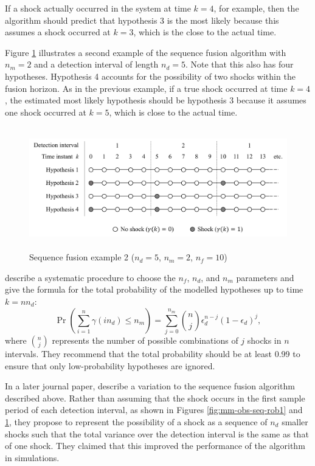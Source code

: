 If a shock actually occurred in the system at time $k=4$, for example, then the algorithm should predict that hypothesis 3 is the most likely because this assumes a shock occurred at $k=3$, which is the close to the actual time.

Figure \ref{fig:mm-obs-seq-rob2} illustrates a second example of the sequence fusion algorithm with $n_m=2$ and a detection interval of length $n_d=5$.  Note that this also has four hypotheses. Hypothesis 4 accounts for the possibility of two shocks within the fusion horizon. As in the previous example, if a true shock occurred at time $k=4$, the estimated most likely hypothesis should be hypothesis 3 because it assumes one shock occurred at $k=5$, which is close to the actual time.

\begin{figure}[htp]
	\centering
	\includegraphics[height=5.3cm]{images/mm_obs_seq_rob2.pdf}
	\caption{Sequence fusion example 2 ($n_d=5$, $n_m=2$, $n_f=10$)}
	\label{fig:mm-obs-seq-rob2}
\end{figure}

\cite{robertson_detection_1995} describe a systematic procedure to choose the $n_f$, $n_d$, and $n_m$ parameters and give the formula for the total probability of the modelled hypotheses up to time $k=n n_d$:
\begin{equation} \label{eq:p_gamma}
	\operatorname{Pr}\left(\sum_{i=1}^{n} \gamma(i n_d) \leq n_m\right) = \sum_{j=0}^{n_m} \binom{n}{j} \epsilon_d^{n-j}(1-\epsilon_d)^{j},
\end{equation}
where $\binom{n}{j}$ represents the number of possible combinations of $j$ shocks in $n$ intervals. They recommend that the total probability should be at least 0.99 to ensure that only low-probability hypotheses are ignored.

In a later journal paper, \cite{robertson_method_1998} describe a variation to the sequence fusion algorithm described above.  Rather than assuming that the shock occurs in the first sample period of each detection interval, as shown in Figures \ref{fig:mm-obs-seq-rob1} and \ref{fig:mm-obs-seq-rob2}, they propose to represent the possibility of a shock as a sequence of $n_d$ smaller shocks such that the total variance over the detection interval is the same as that of one shock. They claimed that this improved the performance of the algorithm in simulations.

